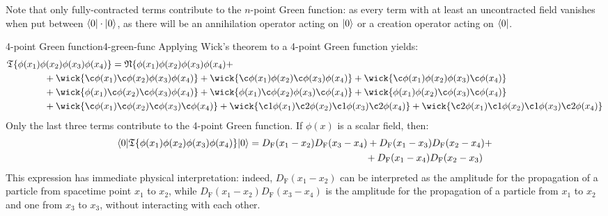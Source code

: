 Note that only fully-contracted terms contribute to the $ n $-point Green function: as every term with at least an uncontracted field vanishes when put between $ \braket{0| \cdot |0} $, as there will be an annihilation operator acting on $ \ket{0} $ or a creation operator acting on $ \bra{0} $.

\begin{example}{4-point Green function}{4-green-func}
  Applying Wick's theorem to a 4-point Green function yields:
  \begin{equation*}
    \begin{split}
      &\tempord\{\phi(x_1) \phi(x_2) \phi(x_3) \phi(x_4)\} = \normord\{\phi(x_1) \phi(x_2) \phi(x_3) \phi(x_4) + \\
      & \qquad \qquad + \wick{\c\phi(x_1) \c\phi(x_2) \phi(x_3) \phi(x_4)} + \wick{\c\phi(x_1) \phi(x_2) \c\phi(x_3) \phi(x_4)} + \wick{\c\phi(x_1) \phi(x_2) \phi(x_3) \c\phi(x_4)} \\
      & \qquad \qquad + \wick{\phi(x_1) \c\phi(x_2) \c\phi(x_3) \phi(x_4)} + \wick{\phi(x_1) \c\phi(x_2) \phi(x_3) \c\phi(x_4)} + \wick{\phi(x_1) \phi(x_2) \c\phi(x_3) \c\phi(x_4)} \\
      & \qquad \qquad + \wick{\c\phi(x_1) \c\phi(x_2) \c\phi(x_3) \c\phi(x_4)} + \wick{\c1\phi(x_1) \c2\phi(x_2) \c1\phi(x_3) \c2\phi(x_4)} + \wick{\c2\phi(x_1) \c1\phi(x_2) \c1\phi(x_3) \c2\phi(x_4)}
    \end{split}
  \end{equation*}
  Only the last three terms contribute to the 4-point Green function. If $ \phi(x) $ is a scalar field, then:
  \begin{equation*}
    \begin{split}
      \braket{0 | \mathfrak{T}\{\phi(x_1) \phi(x_2) \phi(x_3) \phi(x_4)\} | 0}
      & = D_\text{F}(x_1 - x_2) D_\text{F}(x_3 - x_4) + D_\text{F}(x_1 - x_3) D_\text{F}(x_2 - x_4) + \\
      & \qquad \qquad \qquad \qquad \qquad \qquad + D_\text{F}(x_1 - x_4) D_\text{F}(x_2 - x_3)
    \end{split}
  \end{equation*}
  This expression has immediate physical interpretation: indeed, $ D_\text{F}(x_1 - x_2) $ can be interpreted as the amplitude for the propagation of a particle from spacetime point $ x_1 $ to $ x_2 $, while $ D_\text{F}(x_1 - x_2) D_\text{F}(x_3 - x_4) $ is the amplitude for the propagation of a particle from $ x_1 $ to $ x_2 $ and one from $ x_3 $ to $ x_3 $, without interacting with each other. \\

\end{example}
